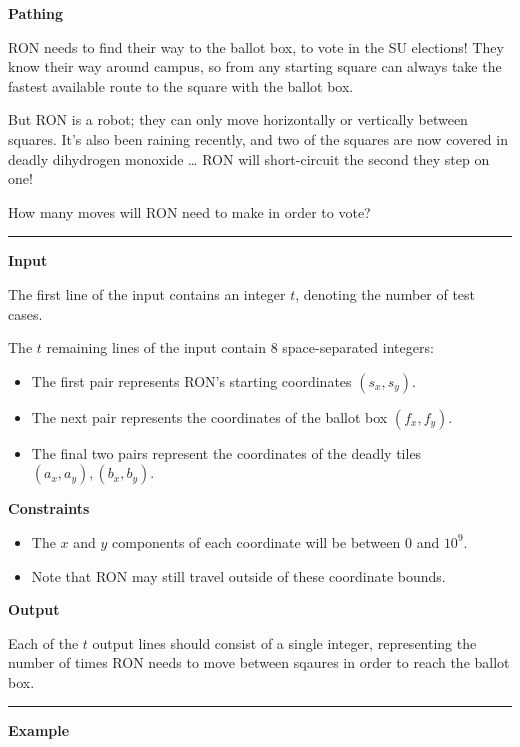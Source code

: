 \LARGE \textbf{Pathing} \normalsize

RON needs to find their way to the ballot box, to vote in the SU elections!
They know their way around campus, so from any starting square can always take the fastest available route to the square with the ballot box.

But RON is a robot; they can only move horizontally or vertically between squares.
It's also been raining recently, and two of the squares are now covered in deadly dihydrogen monoxide \dots
RON will short-circuit the second they step on one! 

How many moves will RON need to make in order to vote?

\vspace{8pt}
\hrule

\textbf{Input}

The first line of the input contains an integer $t$, denoting the number of test cases.

The $t$ remaining lines of the input contain 8 space-separated integers:
\begin{itemize}
    \item The first pair represents RON's starting coordinates $(s_x, s_y)$.
    \item The next pair represents the coordinates of the ballot box $(f_x, f_y)$.
    \item The final two pairs represent the coordinates of the deadly tiles $(a_x, a_y), (b_x, b_y)$.
\end{itemize}

\textbf{Constraints}

\begin{itemize}
    \item The $x$ and $y$ components of each coordinate will be between $0$ and $10^9$.
    \item Note that RON may still travel outside of these coordinate bounds.
\end{itemize}

\textbf{Output}

Each of the $t$ output lines should consist of a single integer, 
representing the number of times RON needs to move between sqaures in order to reach the ballot box.

\vspace{8pt}
\hrule

\textbf{Example}

